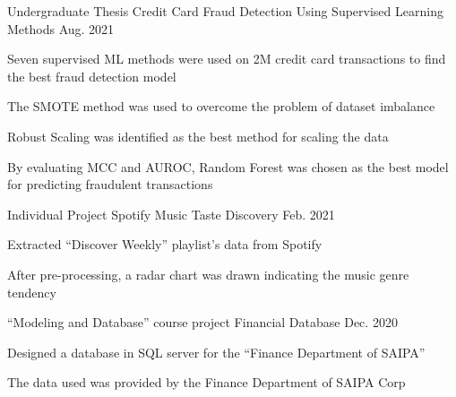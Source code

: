

\begin{cventries}

  \cventry
    {Undergraduate Thesis} %
    {Credit Card Fraud Detection Using Supervised Learning Methods} %
    { } %
    {Aug. 2021} %
    {
      \begin{cvitems} %
        \item {Seven supervised ML methods were used on 2M credit card transactions to find the best fraud detection model}
        \item {The SMOTE method was used to overcome the problem of dataset imbalance}
        \item {Robust Scaling was identified as the best method for scaling the data}
        \item {By evaluating MCC and AUROC, Random Forest was chosen as the best model for predicting fraudulent transactions}
      \end{cvitems}
    }
  \cventry
    {Individual Project} %
    {Spotify Music Taste Discovery} %
    { } %
    {Feb. 2021} %
    {
      \begin{cvitems} %
        \item {Extracted ``Discover Weekly'' playlist's data from Spotify}
        \item {After pre-processing, a radar chart was drawn indicating the music genre tendency}
      \end{cvitems}
    }

  \cventry
    {``Modeling and Database'' course project} %
    {Financial Database} %
    { } %
    {Dec. 2020} %
    {
      \begin{cvitems} %
        \item {Designed a database in SQL server for the ``Finance Department of SAIPA''}
        \item {The data used was provided by the Finance Department of SAIPA Corp}
      \end{cvitems}
    }


\end{cventries}
